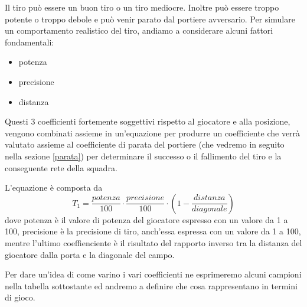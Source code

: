 \documentclass[aps,letterpaper,10pt]{article}
\begin{document}
Il tiro pu\`o essere un buon tiro o un tiro mediocre. Inoltre pu\`o essere troppo potente o troppo debole e pu\`o venir
parato dal portiere avversario. Per simulare un comportamento realistico del tiro, andiamo a considerare alcuni fattori
fondamentali:

\begin{itemize}
	\item potenza
	\item precisione
	\item distanza
\end{itemize}

Questi 3 coefficienti fortemente soggettivi rispetto al giocatore e alla posizione, vengono combinati assieme in
un'equazione per produrre un coefficiente che verr\`a valutato assieme al coefficiente di parata del portiere (che
vedremo in seguito nella sezione \ref{parata}) per determinare il successo o il fallimento del tiro e la conseguente
rete della squadra. \vspace{3mm}

L'equazione \`e composta da $$ T_1 = \frac{potenza}{100} \cdot \frac{precisione}{100} \cdot \left(
1-\frac{distanza}{diagonale} \right) $$ dove potenza \`e il valore di potenza del giocatore espresso con un valore da 1
a 100, precisione \`e la precisione di tiro, anch'essa espressa con un valore da 1 a 100, mentre l'ultimo coeffienciente
\`e il risultato del rapporto inverso tra la distanza del giocatore dalla porta e la diagonale del campo. \vspace{3mm}

Per dare un'idea di come varino i vari coefficienti ne esprimeremo alcuni campioni nella tabella sottostante ed andremo
a definire che cosa rappresentano in termini di gioco.
\end{document}
